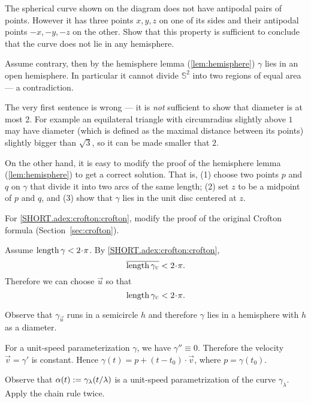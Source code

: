 The spherical curve shown on the diagram does not have antipodal pairs of points.
However it has three points $x,y,z$ on one of its sides and their antipodal points $-x,-y,-z$ on the other.
Show that this property is sufficient to conclude that the curve does not lie in any hemisphere.

Assume contrary, then by the hemisphere lemma (\ref{lem:hemisphere}) $\gamma$ lies in an open hemisphere.
In particular it cannot divide $\mathbb{S}^2$ into two regions of equal area --- a contradiction.

The very first sentence is wrong --- it is {}\emph{not} sufficient to show that diameter is at most 2.
For example an equilateral triangle with circumradius slightly above $1$ may have diameter (which is defined as the maximal distance between its points) slightly bigger than $\sqrt3$, so it can be made smaller that $2$.

On the other hand, it is easy to modify the proof of the hemisphere lemma (\ref{lem:hemisphere}) to get a correct solution.
That is, (1) choose two points $p$ and $q$ on $\gamma$ that divide it into two arcs of the same length;
(2) set $z$ to be a midpoint of $p$ and $q$,
and (3) show that $\gamma$ lies in the unit disc centered at $z$.


For \ref{SHORT.adex:crofton:crofton}, modify the proof of the original Crofton formula
(Section~\ref{sec:crofton}).

Assume $\length \gamma<2\cdot\pi$.
By \ref{SHORT.adex:crofton:crofton},
\[\overline{\length \gamma_{\vec u}}<2\cdot\pi.\]
Therefore we can choose ${\vec u}$ so that 
\[\length \gamma_{\vec u}<2\cdot\pi.\]

Observe that $\gamma_{\vec u}$ runs in a semicircle $h$ and therefore $\gamma$ lies in a hemisphere with $h$ as a diameter.

\setcounter{eqtn}{0}


For a unit-speed parameterization $\gamma$, we have $\gamma''\equiv 0$.
Therefore the velocity $\vec v=\gamma'$ is constant.
Hence $\gamma(t)=p+(t-t_0)\cdot \vec v$, where $p=\gamma(t_0)$.


Observe that $\alpha(t):=\gamma_{\lambda}(t/\lambda)$ is a unit-speed parametrization of the curve $ \gamma_{\lambda}$.
Apply the chain rule twice.


